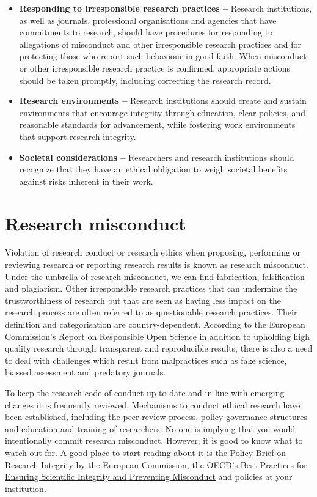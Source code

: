 \documentclass[
]{book}
\begin{document}
\begin{itemize}
\item
  \textbf{Responding to irresponsible research practices --} Research institutions, as well as journals, professional organisations and agencies that have commitments to research, should have procedures for responding to allegations of misconduct and other irresponsible research practices and for protecting those who report such behaviour in good faith. When misconduct or other irresponsible research practice is confirmed, appropriate actions should be taken promptly, including correcting the research record.
\item
  \textbf{Research environments --} Research institutions should create and sustain environments that encourage integrity through education, clear policies, and reasonable standards for advancement, while fostering work environments that support research integrity.
\item
  \textbf{Societal considerations --} Researchers and research institutions should recognize that they have an ethical obligation to weigh societal benefits against risks inherent in their work.
\end{itemize}

\hypertarget{research-misconduct}{%
\section{Research misconduct}\label{research-misconduct}}

Violation of research conduct or research ethics when proposing, performing or reviewing research or reporting research results is known as research misconduct. Under the umbrella of \href{https://en.wikipedia.org/wiki/Scientific_misconduct}{research misconduct}, we can find fabrication, falsification and plagiarism. Other irresponsible research practices that can undermine the trustworthiness of research but that are seen as having less impact on the research process are often referred to as questionable research practices. Their definition and categorisation are country-dependent. According to the European Commission's \href{https://ec.europa.eu/info/sites/default/files/policy_briefing_swafs-30-2020.pdf}{Report on Responsible Open Science} in addition to upholding high quality research through transparent and reproducible results, there is also a need to deal with challenges which result from malpractices such as fake science, biassed assessment and predatory journals.

To keep the research code of conduct up to date and in line with emerging changes it is frequently reviewed. Mechanisms to conduct ethical research have been established, including the peer review process, policy governance structures and education and training of researchers. No one is implying that you would intentionally commit research misconduct. However, it is good to know what to watch out for. A good place to start reading about it is the \href{https://ec.europa.eu/research/participants/documents/downloadPublic?documentIds=080166e5bf5c08aa\&appId=PPGMS}{Policy Brief on Research Integrity} by the European Commission, the OECD's \href{https://www.oecd.org/science/inno/40188303.pdf}{Best Practices for Ensuring Scientific Integrity and Preventing Misconduct} and policies at your institution.
\end{document}
